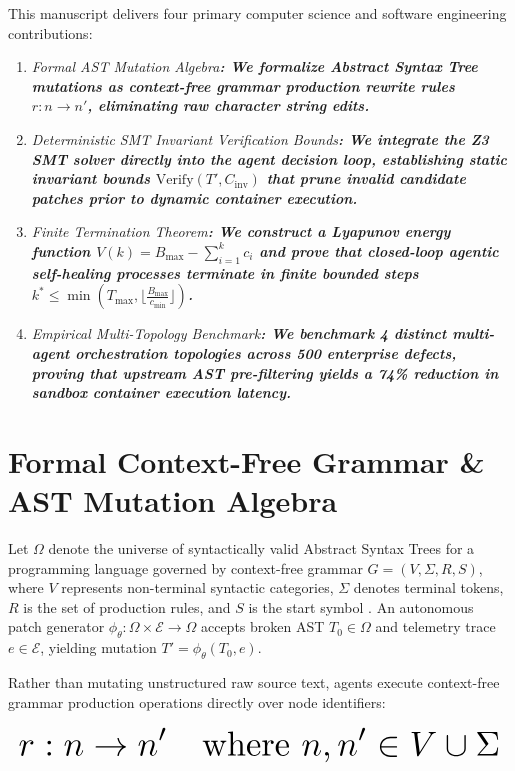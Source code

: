 \documentclass[11pt,a4paper]{article}
\begin{document}
This manuscript delivers four primary computer science and software engineering contributions:
\begin{enumerate}
  \item \textit{Formal AST Mutation Algebra\textbf{: We formalize Abstract Syntax Tree mutations as context-free grammar production rewrite rules $r : n \to n'$, eliminating raw character string edits.}}
  \item \textit{Deterministic SMT Invariant Verification Bounds\textbf{: We integrate the Z3 SMT solver directly into the agent decision loop, establishing static invariant bounds $\text{Verify}(T', C_{\text{inv}})$ that prune invalid candidate patches prior to dynamic container execution.}}
  \item \textit{Finite Termination Theorem\textbf{: We construct a Lyapunov energy function $V(k) = B_{\text{max}} - \sum_{i=1}^k c_i$ and prove that closed-loop agentic self-healing processes terminate in finite bounded steps $k^* \le \min\left(T_{\text{max}}, \lfloor \frac{B_{\text{max}}}{c_{\text{min}}} \rfloor\right)$.}}
  \item \textit{Empirical Multi-Topology Benchmark\textbf{: We benchmark 4 distinct multi-agent orchestration topologies across 500 enterprise defects, proving that upstream AST pre-filtering yields a 74\% reduction in sandbox container execution latency.}}
\end{enumerate}



\section{Formal Context-Free Grammar \& AST Mutation Algebra}


Let $\Omega$ denote the universe of syntactically valid Abstract Syntax Trees for a programming language governed by context-free grammar $G = (V, \Sigma, R, S)$, where $V$ represents non-terminal syntactic categories, $\Sigma$ denotes terminal tokens, $R$ is the set of production rules, and $S$ is the start symbol \cite{bratman1987}. An autonomous patch generator $\phi_\theta : \Omega \times \mathcal{E} \to \Omega$ accepts broken AST $T_0 \in \Omega$ and telemetry trace $e \in \mathcal{E}$, yielding mutation $T' = \phi_\theta(T_0, e)$.

Rather than mutating unstructured raw source text, agents execute context-free grammar production operations directly over node identifiers:

\begin{equation}
\resizebox{\columnwidth}{!}{$\displaystyle
\begin{aligned}
r : n \to n' \quad \text{where } n, n' \in V \cup \Sigma
\end{aligned}
$}
\end{equation}
\end{document}

